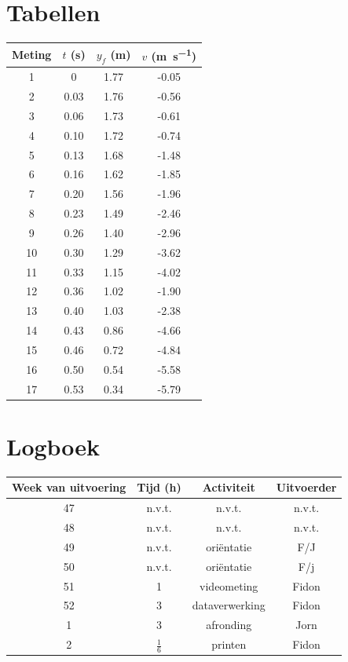 \documentclass[•]{scrartcl}
\begin{document}
\section{Tabellen} 
\begin{center}
\begin{tabular}{*{4}{S[table-format=1.2]}}
\toprule
{Meting} & {$t$ (\si{\second})} & {$y_f$ (\si{\meter})} & {$v$ (\si{\meter\per\second})}\\
& 0	 & 1.77&-0.05 \\
2& 0.03 & 1.76&-0.56 \\
3 &0.06 & 1.73&-0.61 \\
4 &0.10 & 1.72&-0.74 \\
5 &0.13 & 1.68&-1.48 \\
6 &0.16 & 1.62&-1.85 \\
7 &0.20 & 1.56&-1.96 \\
8 &0.23 & 1.49&-2.46 \\
9 &0.26 & 1.40&-2.96 \\
10 &0.30 & 1.29&-3.62 \\
11 &0.33 & 1.15&-4.02 \\
12 &0.36 & 1.02&-1.90 \\
13 &0.40 & 1.03&-2.38 \\
14 &0.43 & 0.86&-4.66 \\
15& 0.46 & 0.72&-4.84 \\
16 &0.50 & 0.54&-5.58 \\
17& 0.53 & 0.34&-5.79 \\
\bottomrule
\end{tabular}
\label{tab:Kwadraat}   
\end{center}
%
\newpage
\section{Logboek}
\begin{center}
\begin{tabular}[center]{*4c}
\toprule
Week van uitvoering & Tijd (\si{\hour})& Activiteit & Uitvoerder\\
\midrule
47 & n.v.t. & n.v.t. & n.v.t.\\
48 &n.v.t.  & n.v.t. & n.v.t.\\
49 & n.v.t. &ori\"{e}ntatie& F/J\\
50 &  n.v.t.&  ori\"{e}ntatie&F/j \\
51 &  1     &videometing  &Fidon \\
52 &  3     &dataverwerking  &Fidon \\
1  &  3     &afronding  &Jorn \\
2 &  $\frac{1}{6}$&printen  &Fidon \\
\bottomrule
\end{tabular}
\end{center}
\end{document}
